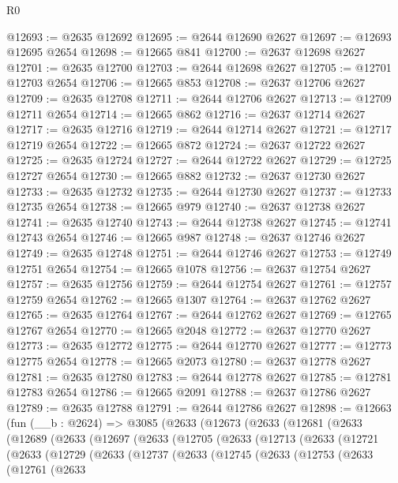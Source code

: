 \begin{lexlean}{R0}
\begin{coremodule}
@12693 := @2635 @12692
@12695 := @2644 @12690 @2627
@12697 := @12693 @12695 @2654
@12698 := @12665 @841
@12700 := @2637 @12698 @2627
@12701 := @2635 @12700
@12703 := @2644 @12698 @2627
@12705 := @12701 @12703 @2654
@12706 := @12665 @853
@12708 := @2637 @12706 @2627
@12709 := @2635 @12708
@12711 := @2644 @12706 @2627
@12713 := @12709 @12711 @2654
@12714 := @12665 @862
@12716 := @2637 @12714 @2627
@12717 := @2635 @12716
@12719 := @2644 @12714 @2627
@12721 := @12717 @12719 @2654
@12722 := @12665 @872
@12724 := @2637 @12722 @2627
@12725 := @2635 @12724
@12727 := @2644 @12722 @2627
@12729 := @12725 @12727 @2654
@12730 := @12665 @882
@12732 := @2637 @12730 @2627
@12733 := @2635 @12732
@12735 := @2644 @12730 @2627
@12737 := @12733 @12735 @2654
@12738 := @12665 @979
@12740 := @2637 @12738 @2627
@12741 := @2635 @12740
@12743 := @2644 @12738 @2627
@12745 := @12741 @12743 @2654
@12746 := @12665 @987
@12748 := @2637 @12746 @2627
@12749 := @2635 @12748
@12751 := @2644 @12746 @2627
@12753 := @12749 @12751 @2654
@12754 := @12665 @1078
@12756 := @2637 @12754 @2627
@12757 := @2635 @12756
@12759 := @2644 @12754 @2627
@12761 := @12757 @12759 @2654
@12762 := @12665 @1307
@12764 := @2637 @12762 @2627
@12765 := @2635 @12764
@12767 := @2644 @12762 @2627
@12769 := @12765 @12767 @2654
@12770 := @12665 @2048
@12772 := @2637 @12770 @2627
@12773 := @2635 @12772
@12775 := @2644 @12770 @2627
@12777 := @12773 @12775 @2654
@12778 := @12665 @2073
@12780 := @2637 @12778 @2627
@12781 := @2635 @12780
@12783 := @2644 @12778 @2627
@12785 := @12781 @12783 @2654
@12786 := @12665 @2091
@12788 := @2637 @12786 @2627
@12789 := @2635 @12788
@12791 := @2644 @12786 @2627
@12898 := @12663
    (fun (__b : @2624) =>
    @3085
      (@2633
        (@12673
          (@2633
            (@12681
              (@2633
                (@12689
                  (@2633
                    (@12697
                      (@2633
                        (@12705
                          (@2633
                            (@12713
                              (@2633
                                (@12721
                                  (@2633
                                    (@12729
                                      (@2633
                                        (@12737
                                          (@2633
                                            (@12745
                                              (@2633
                                                (@12753
                                                  (@2633
                                                    (@12761
                                                      (@2633

\end{coremodule}
\end{lexlean}
